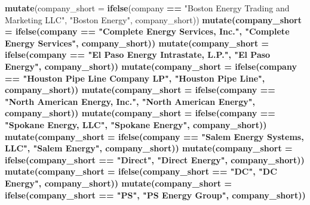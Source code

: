 \documentclass[]{article}
\newenvironment{Shaded}{\begin{snugshade}}{\end{snugshade}}
\newcommand{\KeywordTok}[1]{\textcolor[rgb]{0.13,0.29,0.53}{\textbf{#1}}}
\newcommand{\DataTypeTok}[1]{\textcolor[rgb]{0.13,0.29,0.53}{#1}}
\newcommand{\StringTok}[1]{\textcolor[rgb]{0.31,0.60,0.02}{#1}}
\newcommand{\OperatorTok}[1]{\textcolor[rgb]{0.81,0.36,0.00}{\textbf{#1}}}
\newcommand{\NormalTok}[1]{#1}
\begin{document}
\begin{Shaded}
\begin{Highlighting}[]
{{{{{{{{{{{{{{{{{{{{{{{{{{{{{{\StringTok{  }\KeywordTok{mutate}\NormalTok{(}\DataTypeTok{company_short =} \KeywordTok{ifelse}\NormalTok{(company }\OperatorTok{==}\StringTok{ "Boston Energy Trading and Marketing LLC"}\NormalTok{, }\StringTok{"Boston Energy"}\NormalTok{, company_short))}\OperatorTok{%
\StringTok{  }\KeywordTok{mutate}\NormalTok{(}\DataTypeTok{company_short =} \KeywordTok{ifelse}\NormalTok{(company }\OperatorTok{==}\StringTok{ "Complete Energy Services, Inc."}\NormalTok{, }\StringTok{"Complete Energy Services"}\NormalTok{, company_short))}\OperatorTok{%
\StringTok{  }\KeywordTok{mutate}\NormalTok{(}\DataTypeTok{company_short =} \KeywordTok{ifelse}\NormalTok{(company }\OperatorTok{==}\StringTok{ "El Paso Energy Intrastate, L.P."}\NormalTok{, }\StringTok{"El Paso Energy"}\NormalTok{, company_short))}\OperatorTok{%
\StringTok{  }\KeywordTok{mutate}\NormalTok{(}\DataTypeTok{company_short =} \KeywordTok{ifelse}\NormalTok{(company }\OperatorTok{==}\StringTok{ "Houston Pipe Line Company LP"}\NormalTok{, }\StringTok{"Houston Pipe Line"}\NormalTok{, company_short))}\OperatorTok{%
\StringTok{  }\KeywordTok{mutate}\NormalTok{(}\DataTypeTok{company_short =} \KeywordTok{ifelse}\NormalTok{(company }\OperatorTok{==}\StringTok{ "North American Energy, Inc."}\NormalTok{, }\StringTok{"North American Energy"}\NormalTok{, company_short))}\OperatorTok{%
\StringTok{  }\KeywordTok{mutate}\NormalTok{(}\DataTypeTok{company_short =} \KeywordTok{ifelse}\NormalTok{(company }\OperatorTok{==}\StringTok{ "Spokane Energy, LLC"}\NormalTok{, }\StringTok{"Spokane Energy"}\NormalTok{, company_short))}\OperatorTok{%
\StringTok{  }\KeywordTok{mutate}\NormalTok{(}\DataTypeTok{company_short =} \KeywordTok{ifelse}\NormalTok{(company }\OperatorTok{==}\StringTok{ "Salem Energy Systems, LLC"}\NormalTok{, }\StringTok{"Salem Energy"}\NormalTok{, company_short))}\OperatorTok{%
\StringTok{  }\KeywordTok{mutate}\NormalTok{(}\DataTypeTok{company_short =} \KeywordTok{ifelse}\NormalTok{(company_short }\OperatorTok{==}\StringTok{ "Direct"}\NormalTok{, }\StringTok{"Direct Energy"}\NormalTok{, company_short))}\OperatorTok{%
\StringTok{  }\KeywordTok{mutate}\NormalTok{(}\DataTypeTok{company_short =} \KeywordTok{ifelse}\NormalTok{(company_short }\OperatorTok{==}\StringTok{ "DC"}\NormalTok{, }\StringTok{"DC Energy"}\NormalTok{, company_short))}\OperatorTok{%
\StringTok{  }\KeywordTok{mutate}\NormalTok{(}\DataTypeTok{company_short =} \KeywordTok{ifelse}\NormalTok{(company_short }\OperatorTok{==}\StringTok{ "PS"}\NormalTok{, }\StringTok{"PS Energy Group"}\NormalTok{, company_short)) }\OperatorTok{%
}}}}}}}}}}}}}}}}}}}}}}}}}}}}}}}}}}}}}}}}
\end{Highlighting}
\end{Shaded}
\end{document}
